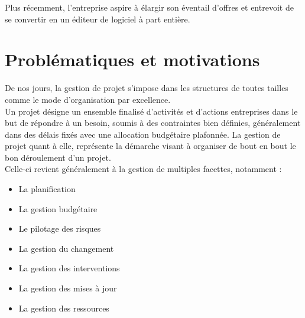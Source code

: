 \begin{spacing}{1.5}
Plus récemment, l'entreprise aspire à élargir son éventail d'offres et entrevoit de se convertir en un éditeur de logiciel à part entière.


\section{Problématiques et motivations}
De nos jours, la gestion de projet s'impose dans les structures de toutes tailles comme le mode d'organisation par excellence.\\
Un projet désigne un ensemble finalisé d'activités et d'actions entreprises dans le but de répondre à un besoin, soumis à des contraintes bien définies, généralement dans des délais fixés avec une allocation budgétaire plafonnée. La gestion de projet quant à elle, représente la démarche visant à organiser de bout en bout le bon déroulement d'un projet.\\
Celle-ci revient généralement à la gestion de multiples facettes, notamment :
\begin{itemize}
    \item La planification
    \item La gestion budgétaire
    \item Le pilotage des risques
    \item La gestion du changement
    \item La gestion des interventions
    \item La gestion des mises à jour
    \item La gestion des ressources
\end{itemize}
\


\end{spacing}
